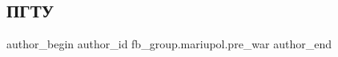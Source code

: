  
 
 
 
 

\subsection{ПГТУ}
\label{sec:19_02_2023.fb.fb_group.mariupol.pre_war.2.pgtu}

\ifcmt
 author_begin
   author_id fb_group.mariupol.pre_war
 author_end
\fi
